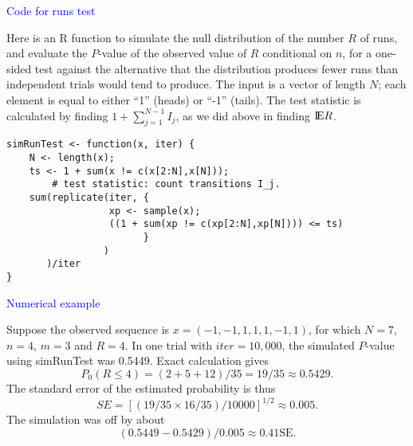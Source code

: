 \documentclass[landscape]{slides}
\newcommand{\EE}{\hbox{I\kern-.1667em\hbox{E}}}
\newcommand{\beq}{\begin{equation}}
\newcommand{\eeq}{\end{equation}}
\begin{document}
\begin{slide}
{\textcolor{blue}{Code for runs test}}

 Here is an R function to simulate the null distribution of the number $R$ of runs,
    and evaluate the $P$-value of the observed value of $R$ conditional
    on $n$, for a one-sided test against the alternative that the distribution
    produces fewer runs than independent trials would tend to produce.
    The input is a vector of length $N$; each element is equal to
    either ``1'' (heads) or ``-1'' (tails).
    The test statistic is calculated by finding
    $1 + \sum_{j=1}^{N-1} I_j$,
    as we did above in finding $\EE R$.
\end{slide}

\begin{slide}
\begin{verbatim}
simRunTest <- function(x, iter) {
    N <- length(x);
    ts <- 1 + sum(x != c(x[2:N],x[N])); 
        # test statistic: count transitions I_j.
    sum(replicate(iter, {
                  xp <- sample(x);
                  ((1 + sum(xp != c(xp[2:N],xp[N]))) <= ts)
                        }
                 )
       )/iter
}
\end{verbatim}

\end{slide}

\begin{slide}
{\textcolor{blue}{Numerical example}}

    Suppose the observed sequence is
    $x = (-1, -1,  1,  1,  1, -1,  1)$,
    for which $N = 7$, $n = 4$, $m = 3$
    and $R = 4$.
    In one trial with $iter = 10,000$, the simulated
    $P$-value using simRunTest was 0.5449.
    Exact calculation gives
\beq
    P_0 (R \le 4) = (2 + 5 + 12)/35 = 19/35 \approx 0.5429.
\eeq
    The standard error of the estimated probability is thus
\beq
    SE = [(19/35\times16/35)/10000]^{1/2} \approx 0.005.
\eeq
The simulation was off by about
\beq
   (0.5449 - 0.5429)/0.005 \approx 0.41\mbox{SE}.
\eeq

\end{slide}
\end{document}
